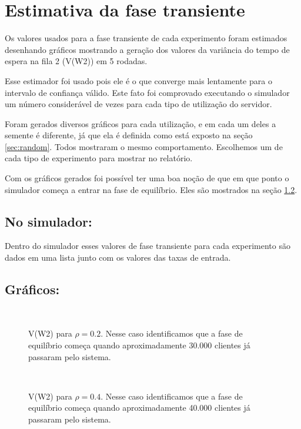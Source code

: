\chapter{Estimativa da fase transiente}
\label{chap:estimativa}

Os valores usados para a fase transiente de cada experimento foram estimados desenhando gráficos mostrando a geração dos valores da variância do tempo de espera na fila 2 (V(W2)) em 5 rodadas.

Esse estimador foi usado pois ele é o que converge mais lentamente para o intervalo de confiança válido. Este fato foi comprovado executando o simulador um número considerável de vezes para cada tipo de utilização do servidor.

Foram gerados diversos gráficos para cada utilização, e em cada um deles a semente é diferente, já que ela é definida como está exposto na seção \ref{sec:random}. Todos mostraram o mesmo comportamento. Escolhemos um de cada tipo de experimento para mostrar no relatório.

Com os gráficos gerados foi possível ter uma boa noção de que em que ponto o simulador começa a entrar na fase de equilíbrio. Eles são mostrados na seção \ref{sec:graficos}.

\section{No simulador:}

Dentro do simulador esses valores de fase transiente para cada experimento são dados em uma lista junto com os valores das taxas de entrada.

\section{Gráficos:}
\label{sec:graficos}

\begin{figure}[htb!]
   \\
   \caption{V(W2) para $\rho=0.2$. Nesse caso identificamos que a fase de equilíbrio começa quando aproximadamente 30.000 clientes já passaram pelo sistema.}
\end{figure}

\begin{figure}[htb!]
   \\
   \caption{V(W2) para $\rho=0.4$. Nesse caso identificamos que a fase de equilíbrio começa quando aproximadamente 40.000 clientes já passaram pelo sistema.}
\end{figure}

